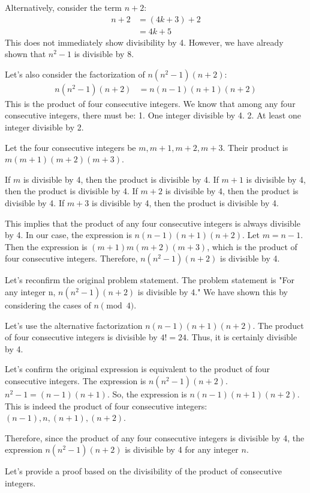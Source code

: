 \documentclass{article}
\begin{document}
Alternatively, consider the term $n+2$:
\begin{align*} n + 2 &= (4k + 3) + 2 \\ &= 4k + 5\end{align*}
This does not immediately show divisibility by 4. However, we have already shown that $n^2 - 1$ is divisible by 8.

Let's also consider the factorization of $n(n^2 - 1)(n + 2)$:
\begin{align*} n(n^2 - 1)(n + 2) &= n(n - 1)(n + 1)(n + 2) \end{align*}
This is the product of four consecutive integers.
We know that among any four consecutive integers, there must be:
1. One integer divisible by 4.
2. At least one integer divisible by 2.

Let the four consecutive integers be $m, m+1, m+2, m+3$.
Their product is $m(m+1)(m+2)(m+3)$.

If $m$ is divisible by 4, then the product is divisible by 4.
If $m+1$ is divisible by 4, then the product is divisible by 4.
If $m+2$ is divisible by 4, then the product is divisible by 4.
If $m+3$ is divisible by 4, then the product is divisible by 4.

This implies that the product of any four consecutive integers is always divisible by 4.
In our case, the expression is $n(n-1)(n+1)(n+2)$.
Let $m = n-1$. Then the expression is $(m+1)m(m+2)(m+3)$, which is the product of four consecutive integers.
Therefore, $n(n^2 - 1)(n + 2)$ is divisible by 4.

Let's reconfirm the original problem statement. The problem statement is "For any integer n, $n(n^2 - 1)(n + 2)$ is divisible by 4."
We have shown this by considering the cases of $n \pmod{4}$.

Let's use the alternative factorization $n(n-1)(n+1)(n+2)$.
The product of four consecutive integers is divisible by $4! = 24$. Thus, it is certainly divisible by 4.

Let's confirm the original expression is equivalent to the product of four consecutive integers.
The expression is $n(n^2 - 1)(n + 2)$.
$n^2 - 1 = (n-1)(n+1)$.
So, the expression is $n(n-1)(n+1)(n+2)$.
This is indeed the product of four consecutive integers: $(n-1), n, (n+1), (n+2)$.

Therefore, since the product of any four consecutive integers is divisible by 4, the expression $n(n^2 - 1)(n + 2)$ is divisible by 4 for any integer $n$.

Let's provide a proof based on the divisibility of the product of consecutive integers.
\end{document}
